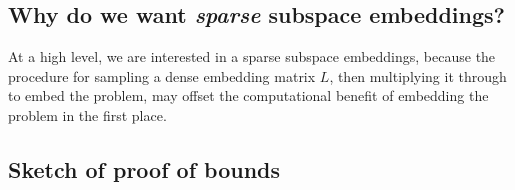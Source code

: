 \documentclass{article}
\begin{document}
\subsection{Why do we want \textit{sparse} subspace embeddings?}
At a high level, we are interested in a sparse subspace embeddings,
because the procedure for sampling a dense embedding matrix $L$,
then multiplying it through to embed the problem, 
may offset the computational benefit of embedding the problem in the first place. 


\subsection{Sketch of proof of bounds}


\newpage


\end{document}
